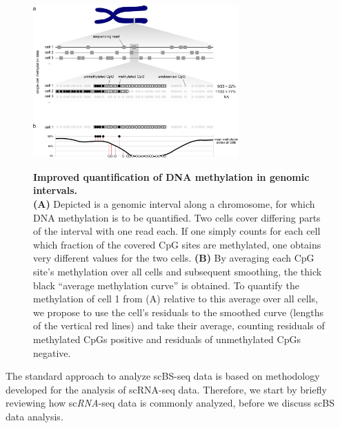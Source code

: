 \documentclass[twocolumn,10pt]{article}
\begin{document}
\begin{figure}[t]
    \begin{center}
        \includegraphics[width=0.7\textwidth]{figures/Fig_residuals_AB.png}\\
    \end{center}
    \caption{\small \textbf{Improved quantification of DNA methylation in genomic intervals.}\\
    \textbf{(A)} Depicted is a genomic interval along a chromosome, for which DNA methylation is to be quantified.
    Two cells cover differing parts of the interval with one read each.
    If one simply counts for each cell which fraction of the covered CpG sites are methylated, one obtains very different values for the two cells.
    \textbf{(B)} By averaging each CpG site's methylation over all cells and subsequent smoothing, the thick black ``average methylation curve'' is obtained.
    To quantify the methylation of cell 1 from (A) relative to this average over all cells, we propose to use the cell's residuals to the smoothed curve (lengths of the vertical red lines) and take their average, counting residuals of methylated CpGs positive and residuals of unmethylated CpGs negative.}
    \label{fig:smoothres}
\end{figure}


The standard approach to analyze scBS-seq data is based on methodology developed for the analysis of scRNA-seq data.
Therefore, we start by briefly reviewing how sc\emph{RNA}-seq data is commonly analyzed, before we discuss scBS data analysis.
\end{document}
